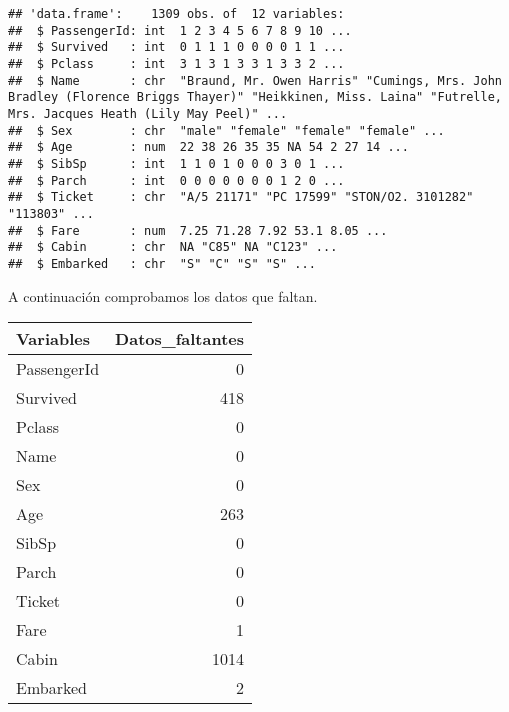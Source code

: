 \documentclass[]{article}
\newenvironment{Shaded}{\begin{snugshade}}{\end{snugshade}}
\newcommand{\KeywordTok}[1]{\textcolor[rgb]{0.13,0.29,0.53}{\textbf{#1}}}
\newcommand{\DataTypeTok}[1]{\textcolor[rgb]{0.13,0.29,0.53}{#1}}
\newcommand{\StringTok}[1]{\textcolor[rgb]{0.31,0.60,0.02}{#1}}
\newcommand{\CommentTok}[1]{\textcolor[rgb]{0.56,0.35,0.01}{\textit{#1}}}
\newcommand{\ControlFlowTok}[1]{\textcolor[rgb]{0.13,0.29,0.53}{\textbf{#1}}}
\newcommand{\OperatorTok}[1]{\textcolor[rgb]{0.81,0.36,0.00}{\textbf{#1}}}
\newcommand{\NormalTok}[1]{#1}
\begin{document}
\begin{verbatim}
## 'data.frame':    1309 obs. of  12 variables:
##  $ PassengerId: int  1 2 3 4 5 6 7 8 9 10 ...
##  $ Survived   : int  0 1 1 1 0 0 0 0 1 1 ...
##  $ Pclass     : int  3 1 3 1 3 3 1 3 3 2 ...
##  $ Name       : chr  "Braund, Mr. Owen Harris" "Cumings, Mrs. John Bradley (Florence Briggs Thayer)" "Heikkinen, Miss. Laina" "Futrelle, Mrs. Jacques Heath (Lily May Peel)" ...
##  $ Sex        : chr  "male" "female" "female" "female" ...
##  $ Age        : num  22 38 26 35 35 NA 54 2 27 14 ...
##  $ SibSp      : int  1 1 0 1 0 0 0 3 0 1 ...
##  $ Parch      : int  0 0 0 0 0 0 0 1 2 0 ...
##  $ Ticket     : chr  "A/5 21171" "PC 17599" "STON/O2. 3101282" "113803" ...
##  $ Fare       : num  7.25 71.28 7.92 53.1 8.05 ...
##  $ Cabin      : chr  NA "C85" NA "C123" ...
##  $ Embarked   : chr  "S" "C" "S" "S" ...
\end{verbatim}

A continuación comprobamos los datos que faltan.

\begin{Shaded}
\end{Shaded}

\begin{tabular}{l|r}
\hline
Variables & Datos\_faltantes\\
\hline
PassengerId & 0\\
\hline
Survived & 418\\
\hline
Pclass & 0\\
\hline
Name & 0\\
\hline
Sex & 0\\
\hline
Age & 263\\
\hline
SibSp & 0\\
\hline
Parch & 0\\
\hline
Ticket & 0\\
\hline
Fare & 1\\
\hline
Cabin & 1014\\
\hline
Embarked & 2\\
\hline
\end{tabular}
\end{document}
